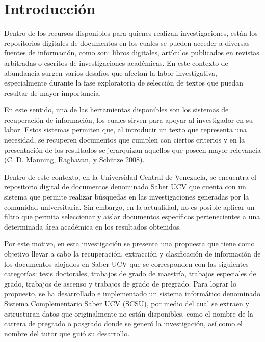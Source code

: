 \documentclass[
  12pt,
  openany]{book}
\begin{document}
\hypertarget{introduccion}{%
\chapter{Introducción}\label{introduccion}}

Dentro de los recursos disponibles para quienes realizan investigaciones, están los repositorios digitales de documentos en los cuales se pueden acceder a diversas fuentes de información, como son: libros digitales, artículos publicados en revistas arbitradas o escritos de investigaciones académicas. En este contexto de abundancia surgen varios desafíos que afectan la labor investigativa, especialmente durante la fase exploratoria de selección de textos que puedan resultar de mayor importancia.

En este sentido, una de las herramientas disponibles son los sistemas de recuperación de información, los cuales sirven para apoyar al investigador en su labor. Estos sistemas permiten que, al introducir un texto que representa una necesidad, se recuperen documentos que cumplen con ciertos criterios y en la presentación de los resultados se jerarquizan aquellos que poseen mayor relevancia (\protect\hyperlink{ref-manning2008}{C. D. Manning, Raghavan, y Schütze 2008}).

Dentro de este contexto, en la Universidad Central de Venezuela, se encuentra el repositorio digital de documentos denominado Saber UCV que cuenta con un sistema que permite realizar búsquedas en las investigaciones generadas por la comunidad universitaria. Sin embargo, en la actualidad, no es posible aplicar un filtro que permita seleccionar y aislar documentos específicos pertenecientes a una determinada área académica en los resultados obtenidos.

Por este motivo, en esta investigación se presenta una propuesta que tiene como objetivo llevar a cabo la recuperación, extracción y clasificación de información de los documentos alojados en Saber UCV que se corresponden con las siguientes categorías: tesis doctorales, trabajos de grado de maestría, trabajos especiales de grado, trabajos de ascenso y trabajos de grado de pregrado. Para lograr lo propuesto, se ha desarrollado e implementado un sistema informático denominado Sistema Complementario Saber UCV (SCSU), por medio del cual se extraen y estructuran datos que originalmente no están disponibles, como el nombre de la carrera de pregrado o posgrado donde se generó la investigación, así como el nombre del tutor que guió su desarrollo.
\end{document}
